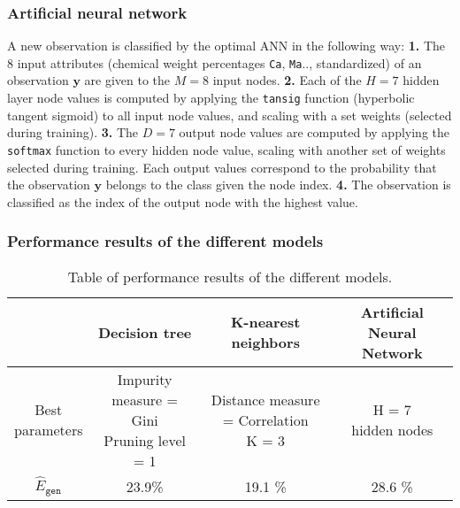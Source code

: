 \subsubsection{Artificial neural network}
A new observation is classified by the optimal ANN in the following way: \textbf{1.} The 8 input attributes (chemical weight percentages \texttt{Ca}, \texttt{Ma}.., standardized) of an observation $\bm{y}$ are given to the $M=8$ input nodes. \textbf{2.} Each of the $H=7$ hidden layer node values is computed by applying the \texttt{tansig} function (hyperbolic tangent sigmoid) to all input node values, and scaling with a set weights (selected during training). \textbf{3.} The $D=7$ output node values are computed by applying the \texttt{softmax} function to every hidden node value, scaling with another set of weights selected during training. Each output values correspond to the probability that the observation $\bm{y}$ belongs to the class given the node index. \textbf{4.} The observation is classified as the index of the output node with the highest value.

\subsubsection{Performance results of the different models}

\begin{table}[H]
    \centering
    \begin{tabular}{c|c c c}
     & Decision tree & K-nearest neighbors & Artificial Neural Network \\ \hline
    \thead{Best\\parameters}     & \thead{Impurity measure = Gini \\ Pruning level = 1} & \thead{Distance measure = Correlation \\ K = 3} & \thead{H = 7 \\hidden nodes} \\ 
    $\hat{E}_{\texttt{gen}} $     & 23.9\% & 19.1 \% & 28.6 \%
    \end{tabular}
    \caption{Table of performance results of the different models.}
    \label{classification-performance}
\end{table}